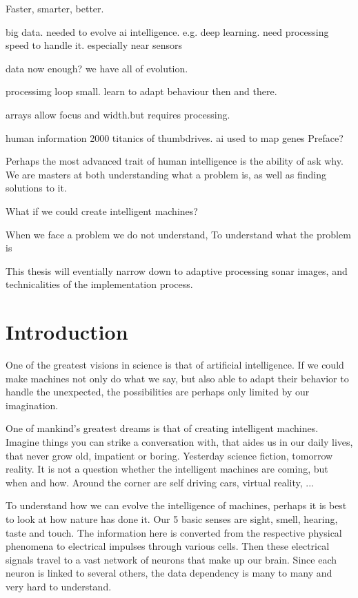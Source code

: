 Faster, smarter, better.

big data. needed to evolve ai intelligence. e.g. deep learning.  need processing speed to handle it. especially near sensors

data now enough? we have all of evolution.

processimg loop small. learn to adapt behaviour then and there.

arrays allow focus and width.but requires processing.

human information 2000 titanics of thumbdrives. ai used to map genes 
Preface?


Perhaps the most advanced trait of human intelligence is the ability of ask why. We are masters at both understanding what a problem is, as well as finding solutions to it. 

What if we could create intelligent machines? 

When we face a problem we do not understand, To understand what the problem is

This thesis will eventially narrow down to adaptive processing sonar images, and technicalities of the implementation process.


\chapter{Introduction}

One of the greatest visions in science is that of artificial intelligence. If we could make machines not only do what we say, but also able to adapt their behavior to handle the unexpected, the possibilities are perhaps only limited by our imagination.

One of mankind's greatest dreams is that of creating intelligent machines. Imagine things you can strike a conversation with, that aides us in our daily lives, that never grow old, impatient or boring. Yesterday science fiction, tomorrow reality. It is not a question whether the intelligent machines are coming, but when and how. Around the corner are self driving cars, virtual reality, ...

To understand how we can evolve the intelligence of machines, perhaps it is best to look at how nature has done it. Our 5 basic senses are sight, smell, hearing, taste and touch. The information here is converted from the respective physical phenomena to electrical impulses through various cells. Then these electrical signals travel to a vast network of neurons that make up our brain. Since each neuron is linked to several others, the data dependency is many to many and very hard to understand.


